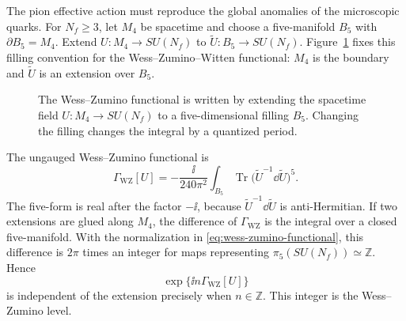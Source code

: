 The pion effective action must reproduce the global anomalies of the
microscopic quarks.  For \(N_f\ge3\), let \(M_4\) be spacetime and choose a
five-manifold \(B_5\) with \(\partial B_5=M_4\).  Extend
\(U:M_4\to SU(N_f)\) to \(\widetilde U:B_5\to SU(N_f)\).
Figure~\ref{fig:wzw-five-dimensional-filling} fixes this filling convention for
the Wess--Zumino--Witten functional: \(M_4\) is the boundary and
\(\widetilde U\) is an extension over \(B_5\).
\begin{figure}[H]
  \centering
  \caption{The Wess--Zumino functional is written by extending the spacetime
  field \(U:M_4\to SU(N_f)\) to a five-dimensional filling \(B_5\).  Changing
  the filling changes the integral by a quantized period.}
  \label{fig:wzw-five-dimensional-filling}
\end{figure}
\begin{definition}
\label{def:wess-zumino-witten-functional}
The ungauged Wess--Zumino functional is
\begin{equation}
  \Gamma_{\mathrm{WZ}}[U]
  =
  -\frac{\ii}{240\pi^2}
  \int_{B_5}
  \operatorname{Tr}
  \bigl(\widetilde U^{-1}\dd \widetilde U\bigr)^5 .
  \label{eq:wess-zumino-functional}
\end{equation}
The five-form is real after the factor \(-\ii\), because
\(\widetilde U^{-1}\dd\widetilde U\) is anti-Hermitian.  If two extensions are
glued along \(M_4\), the difference of \(\Gamma_{\mathrm{WZ}}\) is the
integral over a closed five-manifold.  With the normalization in
\eqref{eq:wess-zumino-functional}, this difference is \(2\pi\) times an
integer for maps representing \(\pi_5(SU(N_f))\simeq\mathbb Z\).  Hence
\[
  \exp\{\ii n\Gamma_{\mathrm{WZ}}[U]\}
\]
is independent of the extension precisely when \(n\in\mathbb Z\).  This
integer is the Wess--Zumino level.
\end{definition}

